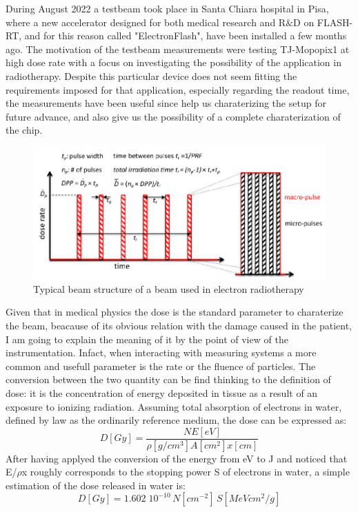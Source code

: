During August 2022 a testbeam took place in Santa Chiara hospital in Pisa, where a new accelerator designed for both medical research and R$\&$D on FLASH-RT, and for this reason called "ElectronFlash", have been installed a few months ago. 
The motivation of the testbeam measurements were testing TJ-Mopopix1 at high dose rate with a focus on investigating the possibility of the application in radiotherapy. Despite this particular device does not seem fitting the requirements imposed for that application, especially regarding the readout time, the measurements have been useful since help us charaterizing the setup for future advance, and also give us the possibility of a complete charaterization of the chip.
\begin{figure}
   \centering
   \includegraphics[width=.9\linewidth]{figures/test_beam/beam_structure.pdf}
   \caption{Typical beam structure of a beam used in electron radiotherapy}
   \label{fig:beam_structure}
\end{figure}

Given that in medical physics the dose is the standard parameter to charaterize the beam, beacause of its obvious relation with the damage caused in the patient, I am going to explain the meaning of it by the point of view of the instrumentation.
Infact, when interacting with measuring systems a more common and usefull parameter is the rate or the fluence of particles.
The conversion between the two quantity can be find thinking to the definition of dose: it is the concentration of energy deposited in tissue as a result of an exposure to ionizing radiation. 
Assuming total absorption of electrons in water, defined by law as the ordinarily reference medium, the dose can be expressed as: 
\begin{equation}
   D[Gy] = \frac{N E[eV]}{\rho[g/cm^3] A[cm^2] x[cm]}
\end{equation}
After having applyed the conversion of the energy from \si{eV} to \si{J} and noticed that E/$\rho$x roughly corresponds to the stopping power S of electrons in water, a simple estimation of the dose released in water is:
\begin{equation}
   D[Gy] = 1.602\;10^{-10}\,N[cm^{-2}]\,S[MeV cm^2/g]
\end{equation}

